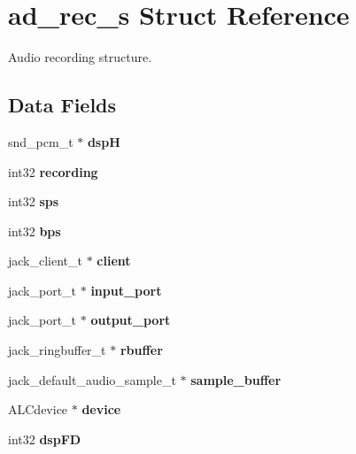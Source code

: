 \section{ad\+\_\+rec\+\_\+s Struct Reference}
\label{structad__rec__s}


Audio recording structure.  


\subsection*{Data Fields}
\begin{DoxyCompactItemize}
\item 
snd\+\_\+pcm\+\_\+t $\ast$ {\bfseries dsp\+H}\label{structad__rec__s_af4b2cd7de40e5b2a48d2d6878d33cc18}

\item 
int32 {\bfseries recording}\label{structad__rec__s_a5ddf90deb3806752a1fa3152fe864047}

\item 
int32 {\bfseries sps}\label{structad__rec__s_a2c5120af44acf19c5c7c63778bc932a3}

\item 
int32 {\bfseries bps}\label{structad__rec__s_a731523ef22607a580877bdcc563d9e5e}

\item 
jack\+\_\+client\+\_\+t $\ast$ {\bfseries client}\label{structad__rec__s_acd700500a367b0cb21306b7152f723af}

\item 
jack\+\_\+port\+\_\+t $\ast$ {\bfseries input\+\_\+port}\label{structad__rec__s_a3acb1e45a779726ee6370ee4f773ed12}

\item 
jack\+\_\+port\+\_\+t $\ast$ {\bfseries output\+\_\+port}\label{structad__rec__s_aa063dd1156101f957df117a0cd2407be}

\item 
jack\+\_\+ringbuffer\+\_\+t $\ast$ {\bfseries rbuffer}\label{structad__rec__s_a39c7bd9b729d4ec0da0bd2c9cfa5e240}

\item 
jack\+\_\+default\+\_\+audio\+\_\+sample\+\_\+t $\ast$ {\bfseries sample\+\_\+buffer}\label{structad__rec__s_a4118f000ae396de0faca9cbf07c2ee61}

\item 
A\+L\+Cdevice $\ast$ {\bfseries device}\label{structad__rec__s_a3e4378783effb06051461aca5a3d2f6c}

\item 
int32 {\bfseries dsp\+F\+D}\label{structad__rec__s_a7bd3eea2ed7b7be7155d4304505b140e}


\end{DoxyCompactItemize}
